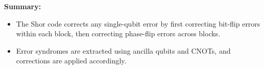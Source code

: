 \documentclass{book}
\begin{document}
\textbf{Summary:}
\begin{itemize}
    \item The Shor code corrects any single-qubit error by first correcting bit-flip errors within each block, then correcting phase-flip errors across blocks.
    \item Error syndromes are extracted using ancilla qubits and CNOTs, and corrections are applied accordingly.
\end{itemize}
\end{document}
